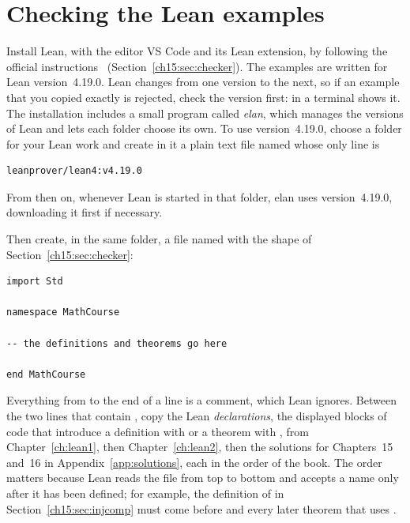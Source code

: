 \section{Checking the Lean examples}\label{appB:sec:lean}
Install Lean, with the editor VS Code and its Lean extension, by following the official instructions~\cite{leaninstall} (Section~\ref{ch15:sec:checker}). The examples are written for Lean version~4.19.0. Lean changes from one version to the next, so if an example that you copied exactly is rejected, check the version first:  in a terminal shows it. The installation includes a small program called \emph{elan}, which manages the versions of Lean and lets each folder choose its own. To use version~4.19.0, choose a folder for your Lean work and create in it a plain text file named  whose only line is
\par\noindent\begin{minipage}{\linewidth}
\begin{lstlisting}
leanprover/lean4:v4.19.0
\end{lstlisting}
\end{minipage}\par
From then on, whenever Lean is started in that folder, elan uses version~4.19.0, downloading it first if necessary.

Then create, in the same folder, a file named  with the shape of Section~\ref{ch15:sec:checker}:
\par\noindent\begin{minipage}{\linewidth}
\begin{lstlisting}
import Std

namespace MathCourse

-- the definitions and theorems go here

end MathCourse
\end{lstlisting}
\end{minipage}\par
Everything from \code{-{}-} to the end of a line is a comment, which Lean ignores. Between the two lines that contain , copy the Lean \emph{declarations}, the displayed blocks of code that introduce a definition with  or a theorem with , from Chapter~\ref{ch:lean1}, then Chapter~\ref{ch:lean2}, then the solutions for Chapters~15 and~16 in Appendix~\ref{app:solutions}, each in the order of the book. The order matters because Lean reads the file from top to bottom and accepts a name only after it has been defined; for example, the definition of  in Section~\ref{ch15:sec:injcomp} must come before  and every later theorem that uses .

